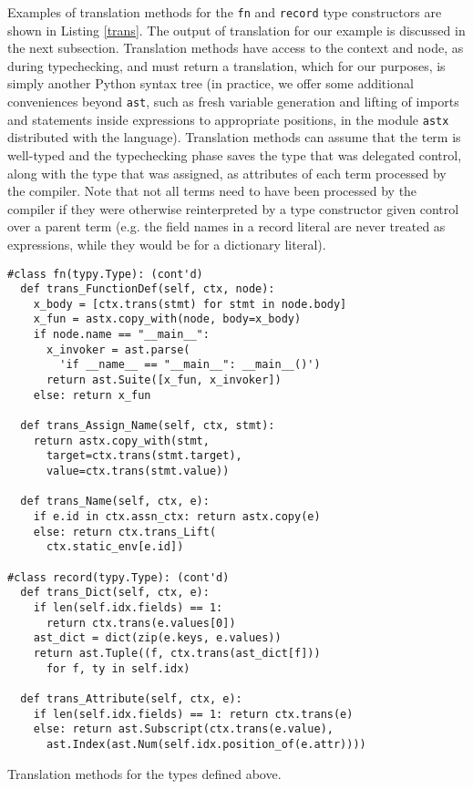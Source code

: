 \documentclass[preprint,10pt]{sigplanconf}
\newcommand{\lip}[1]{\lstinline[language=Python,basicstyle=\ttfamily\small,deletendkeywords={tuple,buffer,map}]{#1}}
\begin{document}
Examples of translation methods for the \lip{fn} and \lip{record} type constructors are shown in Listing \ref{trans}. The output of translation for our example is discussed in the next subsection. Translation methods have access to the context and node, as during typechecking, and must return a translation, which for our purposes, is simply another Python syntax tree (in practice, we offer some additional conveniences beyond \lip{ast}, such as fresh variable generation and lifting of imports and statements inside expressions to appropriate positions, in the module \lip{astx} distributed with the language). Translation methods can assume that the term is well-typed and the typechecking phase saves the type that was delegated control, along with the type that was assigned, as attributes of each term processed by the compiler. Note that not all terms need to have been processed by the compiler if they were otherwise reinterpreted by a type constructor given control over a parent term (e.g. the field names in a record literal are never treated as expressions, while they would be for a dictionary literal). %
\begin{codelisting}[t]
\begin{lstlisting}
#class fn(typy.Type): (cont'd)
  def trans_FunctionDef(self, ctx, node):
    x_body = [ctx.trans(stmt) for stmt in node.body]
    x_fun = astx.copy_with(node, body=x_body)
    if node.name == "__main__": 
      x_invoker = ast.parse(
        'if __name__ == "__main__": __main__()')
      return ast.Suite([x_fun, x_invoker])
    else: return x_fun
  
  def trans_Assign_Name(self, ctx, stmt):
    return astx.copy_with(stmt, 
      target=ctx.trans(stmt.target), 
      value=ctx.trans(stmt.value))
    
  def trans_Name(self, ctx, e):
    if e.id in ctx.assn_ctx: return astx.copy(e)
    else: return ctx.trans_Lift(
      ctx.static_env[e.id])
    
#class record(typy.Type): (cont'd)
  def trans_Dict(self, ctx, e): 
    if len(self.idx.fields) == 1: 
      return ctx.trans(e.values[0])
    ast_dict = dict(zip(e.keys, e.values))
    return ast.Tuple((f, ctx.trans(ast_dict[f]))
      for f, ty in self.idx)

  def trans_Attribute(self, ctx, e):
    if len(self.idx.fields) == 1: return ctx.trans(e)
    else: return ast.Subscript(ctx.trans(e.value), 
      ast.Index(ast.Num(self.idx.position_of(e.attr))))
\end{lstlisting}
\caption{Translation methods for the types defined above.}
\label{trans}
\end{codelisting}
\end{document}
